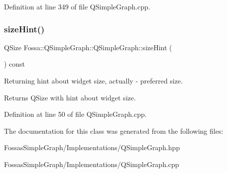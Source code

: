 Definition at line 349 of file Q\+Simple\+Graph.\+cpp.

\mbox{\label{class_fossa_1_1_q_simple_graph_1_1_q_simple_graph_a7cc7465f2137a1d9f80425afec47faeb}} 
\subsubsection{\texorpdfstring{size\+Hint()}{sizeHint()}}
{\footnotesize\ttfamily Q\+Size Fossa\+::\+Q\+Simple\+Graph\+::\+Q\+Simple\+Graph\+::size\+Hint (\begin{DoxyParamCaption}{ }\end{DoxyParamCaption}) const}



Returning hint about widget size, actually -\/ preferred size. 

\begin{DoxyReturn}{Returns}
Q\+Size with hint about widget size. 
\end{DoxyReturn}


Definition at line 50 of file Q\+Simple\+Graph.\+cpp.



The documentation for this class was generated from the following files\+:\begin{DoxyCompactItemize}
\item 
Fossas\+Simple\+Graph/\+Implementations/Q\+Simple\+Graph.\+hpp\item 
Fossas\+Simple\+Graph/\+Implementations/Q\+Simple\+Graph.\+cpp\end{DoxyCompactItemize}
